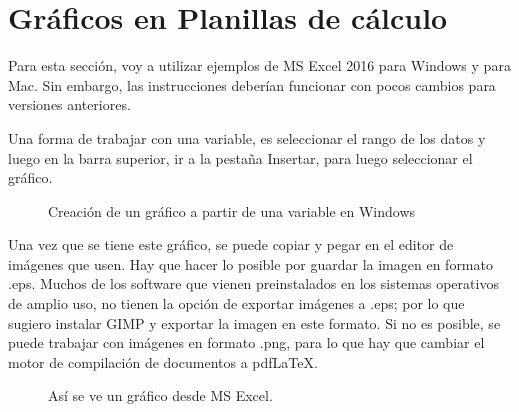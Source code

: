 \documentclass[letterpaper,11pt]{article}
\begin{document}
 \section{Gráficos en Planillas de cálculo}
 
 Para esta sección, voy a utilizar ejemplos de MS Excel 2016 para Windows y para Mac. Sin embargo, las instrucciones deberían funcionar con pocos cambios para versiones anteriores.
 
 Una forma de trabajar con una variable, es seleccionar el rango de los datos y luego en la barra superior, ir a la pestaña {\ttfamily Insertar}, para luego seleccionar el gráfico.
 \begin{figure}[H]
 \centering
 \caption{Creación de un gráfico a partir de una variable en Windows}
 \end{figure}
 
 Una vez que se tiene este gráfico, se puede copiar y pegar en el editor de imágenes que usen. Hay que hacer lo posible por guardar la imagen en formato .eps. Muchos de los software que vienen preinstalados en los sistemas operativos de amplio uso, no tienen la opción de exportar imágenes a .eps; por lo que sugiero instalar GIMP y exportar la imagen en este formato. Si no es posible, se puede trabajar con imágenes en formato .png, para lo que hay que cambiar el motor de compilación de documentos a {\ttfamily pdfLaTeX}.
 
 \begin{figure}[H]
 \centering
 \caption{Así se ve un gráfico desde MS Excel.}
 \end{figure}
 
\end{document}
